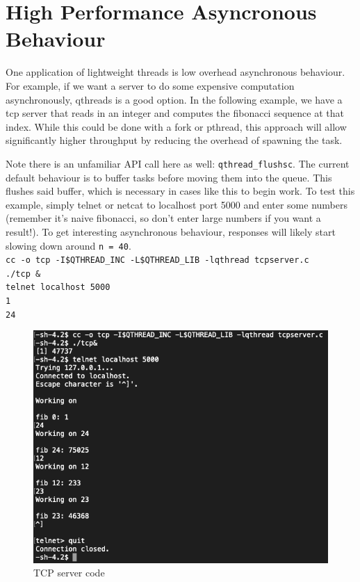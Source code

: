 \documentclass[12pt,fullpage]{article}
\begin{document}


\newpage
\section{High Performance Asyncronous Behaviour}

One application of lightweight threads is low overhead asynchronous behaviour.
For example, if we want a server to do some expensive computation
asynchronously, qthreads is a good option. In the following example, we have a
tcp server that reads in an integer and computes the fibonacci sequence at that
index. While this could be done with a fork or pthread, this approach will allow
significantly higher throughput by reducing the overhead of spawning the task.  


Note there is an unfamiliar API call here as well: {\tt qthread\_flushsc}. The
current default behaviour is to buffer tasks before moving them into the queue.
This flushes said buffer, which is necessary in cases like this to begin work.
To test this example, simply telnet or netcat to localhost port 5000 and
enter some numbers (remember it's naive fibonacci, so don't enter large numbers
if you want a result!). To get interesting asynchronous behaviour, responses will
likely start slowing down around {\tt n = 40}.
\\
{\footnotesize{\tt cc -o tcp -I\$QTHREAD\_INC -L\$QTHREAD\_LIB -lqthread tcpserver.c}}
\\
{\footnotesize{\tt ./tcp \&}}
\\
{\footnotesize{\tt telnet localhost 5000}}
\\
{\footnotesize{\tt 1}}
\\
{\footnotesize{\tt 24}}

\begin{figure}[h]
\includegraphics[scale=0.75]{tcp.png}
\caption{TCP server code}
\end{figure}


\end{document}
